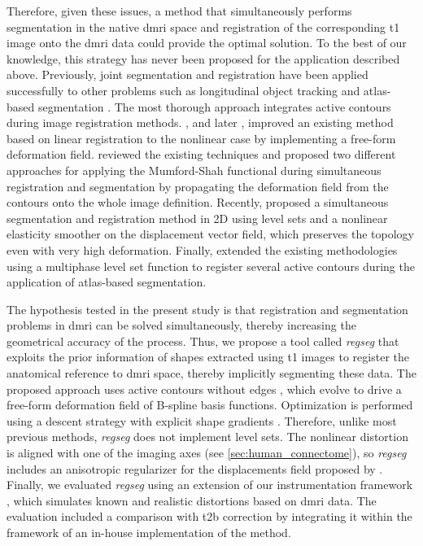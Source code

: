 \documentclass[3p,authoryear,fleqn]{elsarticle}
\providecommand{\regseg}{\emph{regseg}}
\begin{document}
Therefore, given these issues, a method that simultaneously performs
  segmentation in the native \gls*{dmri} space and registration of the corresponding \gls*{t1} image
  onto the \gls*{dmri} data could provide the optimal solution.
To the best of our knowledge, this strategy has never been proposed for the application described above.
Previously, joint segmentation and registration have been applied successfully to other problems
such as longitudinal object tracking \citep{paragios_level_2003} and atlas-based
  segmentation \citep{gorthi_active_2011}.
The most thorough approach integrates active contours during image registration
  methods.
\cite{unal_coupled_2005}, and later \cite{wang_joint_2006},
  improved an existing method \citep{yezzi_variational_2003} based on linear registration
  to the nonlinear case by implementing a free-form deformation field.
\cite{droske_mumfordshah_2009} reviewed the existing techniques and proposed two different
  approaches for applying the Mumford-Shah functional \citep{mumford_optimal_1989} during simultaneous
  registration and segmentation by propagating the deformation field from
  the contours onto the whole image definition.
Recently, \cite{guyader_combined_2011} proposed a simultaneous segmentation and
  registration method in 2D using level sets and a nonlinear elasticity smoother on the
  displacement vector field, which preserves the topology even with very high deformation.
Finally, \cite{gorthi_active_2011} extended the existing methodologies using a multiphase
  level set function to register several active contours during the application
  of atlas-based segmentation.

The hypothesis tested in the present study is that registration and segmentation
  problems in \gls*{dmri} can be solved simultaneously, thereby increasing the geometrical
  accuracy of the process.
Thus, we propose a tool called \regseg{} that exploits the prior information of shapes
  extracted using \gls*{t1} images to register the anatomical reference
  to \gls*{dmri} space, thereby implicitly segmenting these data.
The proposed approach uses active contours without edges \citep{chan_active_2001}, which evolve to drive a
  free-form deformation field of B-spline basis functions.
Optimization is performed using a descent strategy with explicit shape gradients
  \citep{besson_dream2s_2003,herbulot_segmentation_2006}.
Therefore, unlike most previous methods, \regseg{} does not implement level sets.
The nonlinear distortion is aligned with one of the imaging axes (see
  \autoref{sec:human_connectome}), so \regseg{} includes an anisotropic regularizer for
  the displacements field proposed by \cite{nagel_investigation_1986}.
Finally, we evaluated \regseg{} using an extension of our instrumentation framework
  \citep{esteban_simulationbased_2014}, which simulates known and realistic distortions
  based on \gls*{dmri} data.
The evaluation included a comparison with \gls*{t2b} correction by integrating it within the framework
  of an in-house implementation of the method.
 
\end{document}
